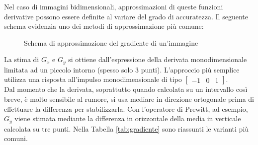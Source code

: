 Nel caso di immagini bidimensionali, approssimazioni di queste funzioni derivative possono essere definite al variare del grado di accuratezza. Il seguente schema evidenzia uno dei metodi di approssimazione più comune:
\begin{figure}[!ht]
\center
{}

\caption{Schema di approssimazione del gradiente di un'immagine}
\label{fig:approssimazione_gradiente}
\end{figure}

La stima di $G_{x}$ e $G_{y}$ si ottiene dall'espressione della derivata monodimensionale limitata ad un piccolo intorno (spesso solo 3 punti).
L'approccio più semplice utilizza una risposta all'impulso monodimensionale di tipo $\left [\begin{matrix}-1 & 0 & 1\end{matrix}\right ]$.\\

Dal momento che la derivata, soprattutto quando calcolata su un intervallo così breve, è molto sensibile al rumore, si usa mediare in direzione ortogonale prima di effettuare la differenza per stabilizzarla. 
Con l'operatore di Prewitt, ad esempio, $G_{y}$ viene stimata mediante la differenza in orizzontale della media in verticale calcolata su tre punti.
Nella Tabella \ref{tab:gradiente} sono riassunti le varianti più comuni.


